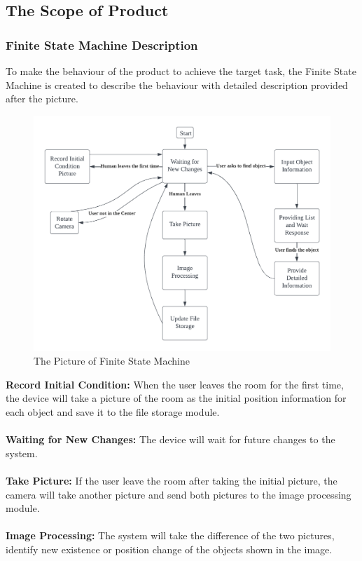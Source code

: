 \documentclass[12pt]{article}
\begin{document}
\subsection{The Scope of Product}
\subsubsection{Finite State Machine Description}
To make the behaviour of the product to achieve the target task, the Finite State Machine is created to describe the behaviour with detailed description provided after the picture. 
\begin{figure}[H]
    \centering
    \includegraphics[scale=0.6]{FSM.png}
    \caption{The Picture of Finite  State Machine}
\end{figure}
\noindent\textbf{Record Initial Condition:} When the user leaves the room for the first time, the device will take a picture of the room as the initial position information for each object and save it to the file storage module. \\\\
\textbf{Waiting for New Changes:} The device will wait for future changes to the system. \\\\
\textbf{Take Picture:} If the user leave the room after taking the initial picture, the camera will take another picture and send both pictures to the image processing module.  \\\\
\textbf{Image Processing:} The system will take the difference of the two pictures, identify new existence or position change of the objects shown in the image.\\\\
\end{document}
